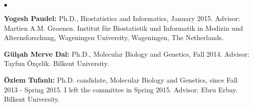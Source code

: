 \documentclass[margin,line]{res}
\newenvironment{list2}{
  \begin{list}{$\bullet$}{%
      \setlength{\itemsep}{0.1cm}
      \setlength{\parsep}{0in} \setlength{\parskip}{0in}
      \setlength{\topsep}{0in} \setlength{\partopsep}{0in} 
      \setlength{\leftmargin}{0.2in}}}{\end{list}}
\begin{document}
\begin{resume}
\begin{list2}
\clearpage

\item
  {\bf Yogesh Paudel:} Ph.D., Biostatistics and Informatics,  January 2015.
  Advisor: Martien A.M. Groenen.
  Institut für Biostatistik und Informatik in Medizin und Alternsforschung,  Wageningen University, Wageningen, The Netherlands.
  
\item
  {\bf G\"{u}l\c{s}ah Merve Dal:} Ph.D., Molecular Biology and Genetics, Fall 2014.
  Advisor: Tayfun Özçelik.
  Bilkent University. 
\item
  {\bf Özlem Tufanlı:} Ph.D. candidate, Molecular Biology and Genetics, since Fall 2013 - Spring 2015. I left the committee in Spring 2015.
  Advisor: Ebru Erbay.
  Bilkent University.
  \end{list2}

\vspace*{-.4cm}

\end{resume}
\end{document}

